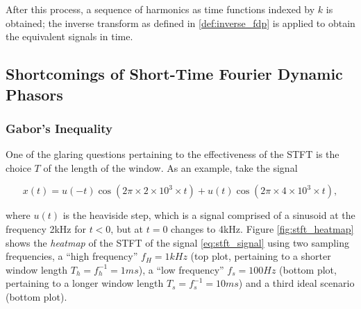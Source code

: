 	After this process, a sequence of harmonics as time functions indexed by $k$ is obtained; the inverse transform as defined in \eqref{def:inverse_fdp} is applied to obtain the equivalent signals in time.

\subsection{Shortcomings of Short-Time Fourier Dynamic Phasors} %

\subsubsection{Gabor's Inequality} %

	One of the glaring questions pertaining to the effectiveness of the STFT is the choice $T$ of the length of the window. As an example, take the signal

\begin{equation} x(t) = u(-t) \cos\left(2\pi\times 2\times 10^3 \times t\right) + u(t) \cos\left(2\pi\times 4\times 10^3 \times t\right), \label{eq:stft_signal} \end{equation}

	\noindent where $u(t)$ is the heaviside step, which is a signal comprised of a sinusoid at the frequency 2kHz for $t < 0$, but at $t = 0$ changes to 4kHz. Figure \ref{fig:stft_heatmap} shows the \textit{heatmap} of the STFT of the signal \eqref{eq:stft_signal} using two sampling frequencies, a ``high frequency'' $f_H = 1kHz$ (top plot, pertaining to a shorter window length $T_h = f_h^{-1} = 1ms$), a ``low frequency'' $f_s = 100Hz$ (bottom plot, pertaining to a longer window length $T_s = f_s^{-1} = 10ms$) and a third ideal scenario (bottom plot).

